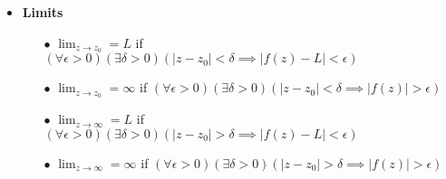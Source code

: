 \documentclass[12pt]{article}
\begin{document}
\begin{itemize}
    \item \textbf{Limits} \begin{itemize}
        \item[$\bullet$] $\lim_{z\rightarrow z_0}=L$ if $(\forall\epsilon>0)(\exists\delta>0)(|z-z_0|<\delta\implies|f(z)-L|<\epsilon)$
        \item[$\bullet$] $\lim_{z\rightarrow z_0}=\infty$ if $(\forall\epsilon>0)(\exists\delta>0)(|z-z_0|<\delta\implies|f(z)|>\epsilon)$
        \item[$\bullet$] $\lim_{z\rightarrow\infty}=L$ if $(\forall\epsilon>0)(\exists\delta>0)(|z-z_0|>\delta\implies|f(z)-L|<\epsilon)$
        \item[$\bullet$] $\lim_{z\rightarrow\infty}=\infty$ if $(\forall\epsilon>0)(\exists\delta>0)(|z-z_0|>\delta\implies|f(z)|>\epsilon)$
    \end{itemize}
\end{itemize}
\end{document}
